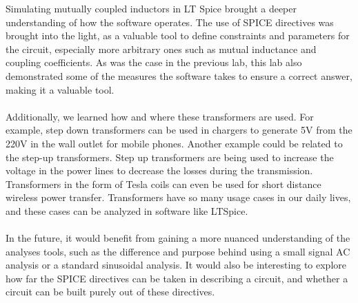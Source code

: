 \documentclass[journal]{IEEEtran}
\begin{document}
\noindent Simulating mutually coupled inductors in LT Spice brought a deeper understanding of how the software operates. The use of SPICE directives was brought into the light, as a valuable tool to define constraints and parameters for the circuit, especially more arbitrary ones such as mutual inductance and coupling coefficients. As was the case in the previous lab, this lab also demonstrated some of the measures the software takes to ensure a correct answer, making it a valuable tool. \\
\\
\noindent Additionally, we learned how and where these transformers are used. For example, step down transformers can be used in chargers to generate 5V from the 220V in the wall outlet for mobile phones. Another example could be related to the step-up transformers. Step up transformers are being used to increase the voltage in the power lines to decrease the losses during the transmission. Transformers in the form of Tesla coils can even be used for short distance wireless power transfer. Transformers have so many usage cases in our daily lives, and these cases can be analyzed in software like LTSpice. \\
\\
\noindent In the future, it would benefit from gaining a more nuanced understanding of the analyses tools, such as the difference and purpose behind using a small signal AC analysis or a standard sinusoidal analysis. It would also be interesting to explore how far the SPICE directives can be taken in describing a circuit, and whether a circuit can be built purely out of these directives. 





\noindent



\printbibliography
\end{document}
